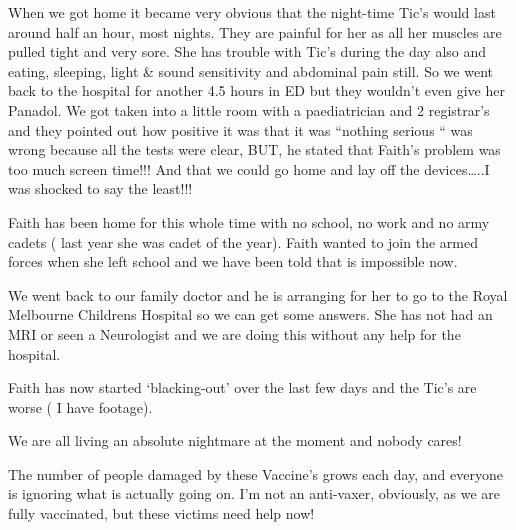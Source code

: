 When we got home it became very obvious that the night-time Tic’s would last
around half an hour, most nights. They are painful for her as all her muscles
are pulled tight and very sore. She has trouble with Tic’s during the day also
and eating, sleeping, light \& sound sensitivity and abdominal pain still. So we
went back to the hospital for another 4.5 hours in ED but they wouldn’t even
give her Panadol. We got taken into a little room with a paediatrician and 2
registrar’s and they pointed out how positive it was that it was “nothing
serious “ was wrong because all the tests were clear, BUT, he stated that
Faith’s problem was too much screen time!!! And that we could go home and lay
off the devices…..I was shocked to say the least!!!

Faith has been home for this whole time with no school, no work and no army
cadets ( last year she was cadet of the year). Faith wanted to join the armed
forces when she left school and we have been told that is impossible now.

We went back to our family doctor and he is arranging for her to go to the Royal
Melbourne Childrens Hospital so we can get some answers. She has not had an MRI
or seen a Neurologist and we are doing this without any help for the hospital.

Faith has now started ‘blacking-out’ over the last few days and the Tic’s are
worse ( I have footage).

We are all living an absolute nightmare at the moment and nobody cares!

The number of people damaged by these Vaccine’s grows each day, and everyone is
ignoring what is actually going on. I’m not an anti-vaxer, obviously, as we are
fully vaccinated, but these victims need help now!
